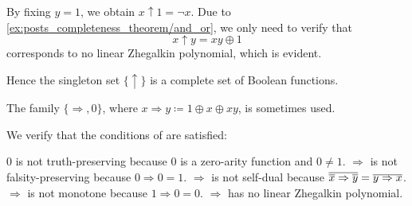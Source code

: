 \begin{example}
\begin{exenum}
    By fixing \( y = 1 \), we obtain \( x \uparrow 1 = \neg x \). Due to \cref{ex:posts_completeness_theorem/and_or}, we only need to verify that
    \begin{equation*}
      x \uparrow y = xy \oplus 1
    \end{equation*}
    corresponds to no linear Zhegalkin polynomial, which is evident.

    Hence the singleton set \( \{ \uparrow \} \) is a complete set of Boolean functions.

     The family \( \{ \Rightarrow, 0 \} \), where \( x \Rightarrow y \coloneqq 1 \oplus x \oplus xy \), is sometimes used.

    We verify that the conditions of  are satisfied:
    \begin{description}
        \( 0 \) is not truth-preserving because \( 0 \) is a zero-arity function and \( 0 \neq 1 \).
       \( \Rightarrow \) is not falsity-preserving because \( 0 \Rightarrow 0 = 1 \).
       \( \Rightarrow \) is not self-dual because \( \overline{\overline{x} \Rightarrow \overline{y}} = \overline{y \Rightarrow x} \).
       \( \Rightarrow \) is not monotone because \( 1 \Rightarrow 0 = 0 \).
       \( \Rightarrow \) has no linear Zhegalkin polynomial.
    \end{description}
  \end{exenum}
\end{example}
